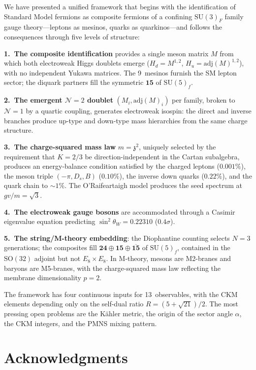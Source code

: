 \documentclass[12pt,a4paper]{article}
\newcommand{\SU}{\mathrm{SU}}
\newcommand{\SO}{\mathrm{SO}}
\newcommand{\adj}{\mathrm{adj}}
\newcommand{\zch}{\mathfrak{z}}
\begin{document}
We have presented a unified framework that begins with the
identification of Standard Model fermions as composite fermions
of a confining $\SU(3)_F$ family gauge theory---leptons as
mesinos, quarks as quarkinos---and follows the consequences
through five levels of structure:

\textbf{1.\ The composite identification} provides a single
meson matrix $M$ from which both electroweak Higgs doublets
emerge ($H_d = M^{1,2}$, $H_u = \adj(M)^{1,2}$), with no
independent Yukawa matrices.
The 9~mesinos furnish the SM lepton sector; the diquark
partners fill the symmetric $\mathbf{15}$ of $\SU(5)_f$.

\textbf{2.\ The emergent $\mathcal{N}{=}2$ doublet}
$(M_i, \adj(M)_i)$ per family, broken to $\mathcal{N}{=}1$
by a quartic coupling, generates electroweak isospin: the
direct and inverse branches produce up-type and down-type
mass hierarchies from the same charge structure.

\textbf{3.\ The charge-squared mass law} $m = \zch^2$,
uniquely selected by the requirement that $K = 2/3$ be
direction-independent in the Cartan subalgebra, produces an
energy-balance condition satisfied by the charged leptons
($0.001\%$), the meson triple $(-\pi, D_s, B)$ ($0.10\%$),
the inverse down quarks ($0.22\%$), and the quark chain
to $\sim 1\%$.
The O'Raifeartaigh model produces the seed spectrum at
$gv/m = \sqrt{3}$.

\textbf{4.\ The electroweak gauge bosons} are accommodated
through a Casimir eigenvalue equation predicting
$\sin^2\theta_W = 0.22310$ ($0.4\sigma$).

\textbf{5.\ The string/M-theory embedding}: the Diophantine
counting selects $N = 3$ generations; the composites fill
$\mathbf{24} \oplus \mathbf{15} \oplus \overline{\mathbf{15}}$
of $\SU(5)_f$, contained in the $\SO(32)$ adjoint but not
$E_8 \times E_8$.
In M-theory, mesons are M2-branes and baryons are M5-branes,
with the charge-squared mass law reflecting the membrane
dimensionality $p = 2$.

The framework has four continuous inputs for 13~observables,
with the CKM elements depending only on the self-dual ratio
$R = (5+\sqrt{21})/2$.
The most pressing open problems are the K\"ahler metric,
the origin of the sector angle $\alpha$, the CKM integers,
and the PMNS mixing pattern.


\section*{Acknowledgments}
\end{document}
